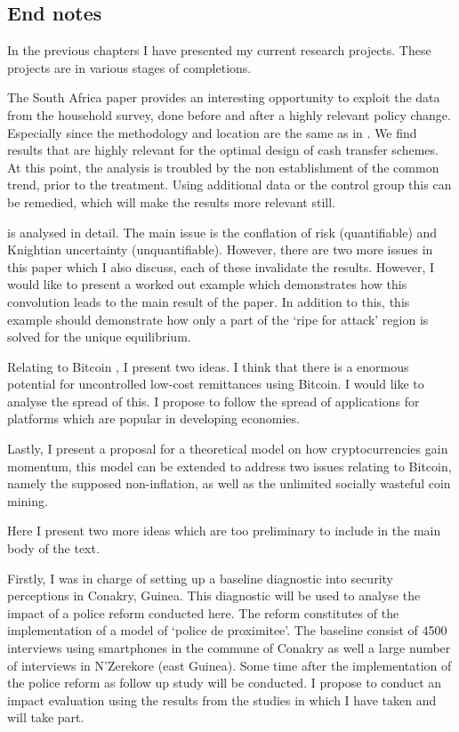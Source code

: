 \begin{refsection}
\chapter{End notes}
\label{end-notes}
In the previous chapters I have presented my current research projects.
These projects are in various stages of completions.


The South Africa paper provides an interesting opportunity to exploit the data from the household survey,
done before and after a highly relevant policy change.
Especially since the methodology and location are the same as in \textcite{duflo2000child, duflo2003grandmothers}.
We find results that are highly relevant for the optimal design of cash transfer schemes.
At this point, the analysis is troubled by the non establishment of the common trend, prior to the treatment.
Using additional data or the control group this can be remedied, which will make the results more relevant still.

\textcite{morris1998unique} is analysed in detail.
The main issue is the conflation of risk (quantifiable) and Knightian uncertainty (unquantifiable).
However, there are two more issues in this paper which I also discuss, each of these invalidate the results.
However, I would like to present a worked out example which demonstrates how this convolution leads to the main result of the paper.
In addition to this, this example should demonstrate how only a part of the `ripe for attack' region is solved for the unique equilibrium.

Relating to Bitcoin \parencite{nakamoto2008bitcoin}, I present two ideas.
I think that there is a enormous potential for uncontrolled low-cost remittances using Bitcoin.
I would like to analyse the spread of this.
I propose to follow the spread of applications for platforms which are popular in developing economies.

Lastly, I present a proposal for a theoretical model on how cryptocurrencies gain momentum, this model can be extended to address two issues relating to Bitcoin, namely the supposed non-inflation, as well as the unlimited socially wasteful coin mining.

Here I present two more ideas which are too preliminary to include in the main body of the text.

Firstly, I was in charge of setting up a baseline diagnostic into security perceptions in Conakry, Guinea. This diagnostic will be used to analyse the impact of a police reform conducted here. The reform constitutes of the implementation of a model of `police de proximitee'. The baseline consist of 4500 interviews using smartphones in the commune of Conakry as well a large number of interviews in N'Zerekore (east Guinea). Some time after the implementation of the police reform as follow up study will be conducted. I propose to conduct an impact evaluation using the results from the studies in which I have taken and will take part.


\end{refsection}
